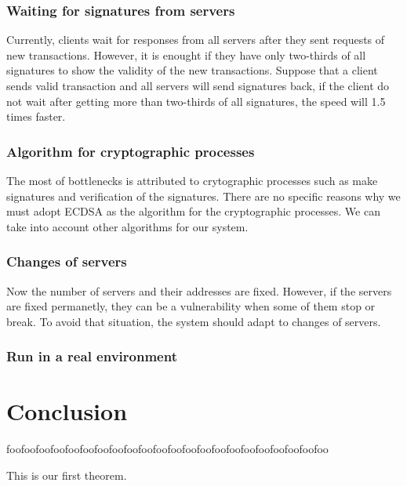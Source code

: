 \documentclass[a4paper, oneside]{discothesis}
\begin{document}
\subsection{Waiting for signatures from servers}
Currently, clients wait for responses from all servers
after they sent requests of new transactions.
However, it is enought if they have only two-thirds of all signatures
to show the validity of the new transactions.
Suppose that a client sends valid transaction and all servers will send signatures back,
if the client do not wait after getting more than two-thirds of all signatures,
the speed will 1.5 times faster.


\subsection{Algorithm for cryptographic processes}
The most of bottlenecks is attributed to crytographic processes
such as make signatures and verification of the signatures.
There are no specific reasons why we must adopt ECDSA as the algorithm
for the cryptographic processes.
We can take into account other algorithms for our system.


\subsection{Changes of servers}
Now the number of servers and their addresses are fixed.
However, if the servers are fixed permanetly,
they can be a vulnerability when some of them stop or break.
To avoid that situation, the system should adapt to changes of servers.

\subsection{Run in a real environment}

\chapter{Conclusion}
foofoofoofoofoofoofoofoofoofoofoofoofoofoofoofoofoofoofoofoofoofoo

\begin{theorem} \label{thm:first theorem}
	This is our first theorem.
\end{theorem}
\end{document}
